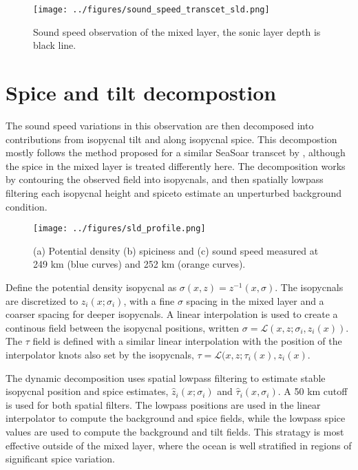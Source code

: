 \documentclass[preprint]{JASA}
\begin{document}
\begin{figure}
\texttt{[image: ../figures/sound\_speed\_transcet\_sld.png]}
\caption{\label{fig:transcet}{Sound speed observation of the mixed layer, the sonic layer depth is black line.}}
\end{figure}

\section{\label{sec:decomposition}Spice and tilt decompostion}
The sound speed variations in this observation are then decomposed into contributions from isopycnal tilt and along isopycnal spice. This decompostion mostly follows the method proposed for a similar SeaSoar transcet by \citet{dzieciuch2004}, although the spice in the mixed layer is treated differently here. The decomposition works by contouring the observed field into isopycnals, and then spatially lowpass filtering each isopycnal height and spiceto estimate an unperturbed background condition.

\begin{figure}
\texttt{[image: ../figures/sld\_profile.png]}
    \caption{\label{fig:transcet}{(a) Potential density (b) spiciness and (c) sound speed measured at 249 km (blue curves) and 252 km (orange curves).}}
\end{figure}

Define the potential density isopycnal as $\sigma(x, z) = z^{-1}(x, \sigma)$. The isopycnals are discretized to $z_i(x; \sigma_i)$, with a fine $\sigma$ spacing in the mixed layer and a coarser spacing for deeper isopycnals. A linear interpolation is used to create a continous field between the isopycnal positions, written $\sigma=\mathcal{L}(x, z;\sigma_i, z_i(x))$. The $\tau$ field is defined with a similar linear interpolation with the position of the interpolator knots also set by the isopycnals, $\tau = \mathcal{L}(x, z; \tau_i(x), z_i(x)$.

The dynamic decomposition uses spatial lowpass filtering to estimate stable isopycnal position and spice estimates, $\hat{z}_i(x; \sigma_i)$ and $\hat{\tau}_i(x, \sigma_i)$. A 50 km cutoff is used for both spatial filters. The lowpass positions are used in the linear interpolator to compute the background and spice fields, while the lowpass spice values are used to compute the background and tilt fields. This stratagy is most effective outside of the mixed layer, where the ocean is well stratified in regions of significant spice variation.
\end{document}
